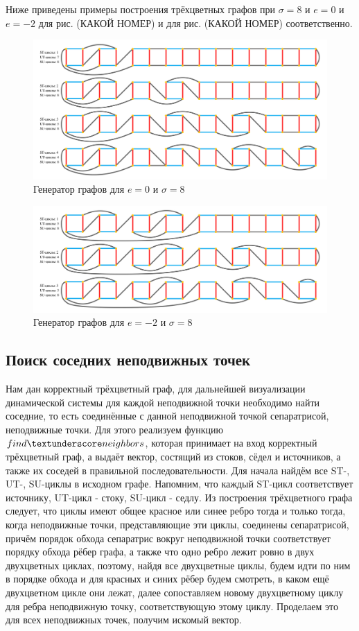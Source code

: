 	Ниже приведены примеры построения трёхцветных графов при $\sigma=8$ и $e=0$ и $e=-2$ для рис. (КАКОЙ НОМЕР) и для рис. (КАКОЙ НОМЕР) соответственно.
	\begin{figure}[ht!]
	\centering
	\includegraphics[width=\textwidth]{Torus.png}
	\caption{Генератор графов для $e=0$ и $\sigma=8$ \label{overflow}}
	\end{figure}
	\begin{figure}[ht!]
	\centering
	\includegraphics[width=\textwidth]{Double Torus.png}
	\caption{Генератор графов для $e=-2$ и $\sigma=8$ \label{overflow}}
	\end{figure}
	\subsection{Поиск соседних неподвижных точек}
	Нам дан корректный трёхцветный граф, для дальнейшей визуализации динамической системы для каждой неподвижной точки необходимо найти соседние, то есть соединённые с данной неподвижной точкой сепаратрисой, неподвижные точки. Для этого реализуем функцию $find \textunderscore neighbors$, которая принимает на вход корректный трёхцветный граф, а выдаёт вектор, состящий из стоков, сёдел и источников, а также их соседей в правильной последовательности.
	Для начала найдём все ST-, UT-, SU-циклы в исходном графе. Напомним, что каждый ST-цикл соответствует источнику, UT-цикл - стоку, SU-цикл - седлу. Из построения трёхцветного графа следует, что циклы имеют общее красное или синее ребро тогда и только тогда, когда неподвижные точки, представляющие эти циклы, соединены сепаратрисой, причём порядок обхода сепаратрис вокруг неподвижной точки соответствует порядку обхода рёбер графа, а также что одно ребро лежит ровно в двух двухцветных циклах, поэтому, найдя все двухцветные циклы, будем идти по ним в порядке обхода и для красных и синих рёбер будем смотреть, в каком ещё двухцветном цикле они лежат, далее сопоставляем новому двухцветному циклу для ребра неподвижную точку, соответствующую этому циклу. Проделаем это для всех неподвижных точек, получим искомый вектор.
